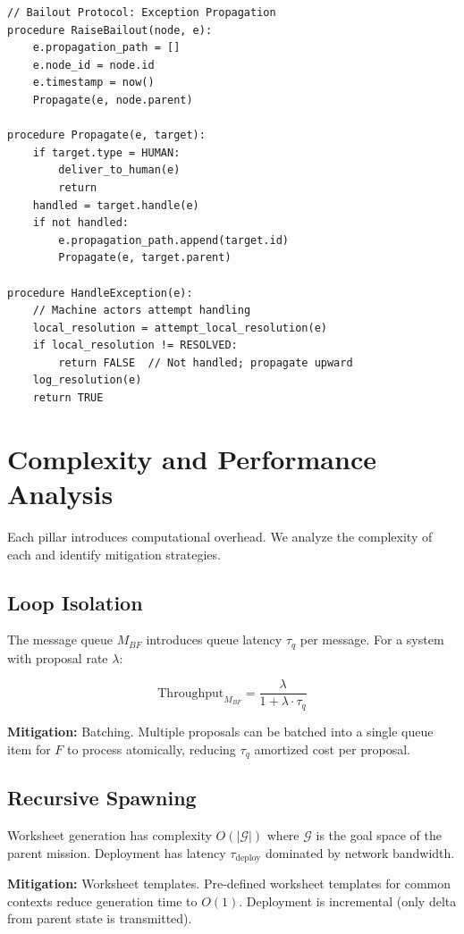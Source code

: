 \documentclass[12pt]{article}
\begin{document}
\begin{verbatim}
// Bailout Protocol: Exception Propagation
procedure RaiseBailout(node, e):
    e.propagation_path = []
    e.node_id = node.id
    e.timestamp = now()
    Propagate(e, node.parent)

procedure Propagate(e, target):
    if target.type = HUMAN:
        deliver_to_human(e)
        return
    handled = target.handle(e)
    if not handled:
        e.propagation_path.append(target.id)
        Propagate(e, target.parent)

procedure HandleException(e):
    // Machine actors attempt handling
    local_resolution = attempt_local_resolution(e)
    if local_resolution != RESOLVED:
        return FALSE  // Not handled; propagate upward
    log_resolution(e)
    return TRUE
\end{verbatim}

\section{Complexity and Performance Analysis}
\label{sec:complexity}

Each pillar introduces computational overhead. We analyze the complexity of each and identify mitigation strategies.

\subsection{Loop Isolation}
The message queue $M_{BF}$ introduces queue latency $\tau_q$ per message. For a system with proposal rate $\lambda$:

\begin{equation}
\text{Throughput}_{M_{BF}} = \frac{\lambda}{1 + \lambda \cdot \tau_q}
\end{equation}

\textbf{Mitigation:} Batching. Multiple proposals can be batched into a single queue item for $F$ to process atomically, reducing $\tau_q$ amortized cost per proposal.

\subsection{Recursive Spawning}
Worksheet generation has complexity $O(|\mathcal{G}|)$ where $\mathcal{G}$ is the goal space of the parent mission. Deployment has latency $\tau_{\text{deploy}}$ dominated by network bandwidth.

\textbf{Mitigation:} Worksheet templates. Pre-defined worksheet templates for common contexts reduce generation time to $O(1)$. Deployment is incremental (only delta from parent state is transmitted).
\end{document}
